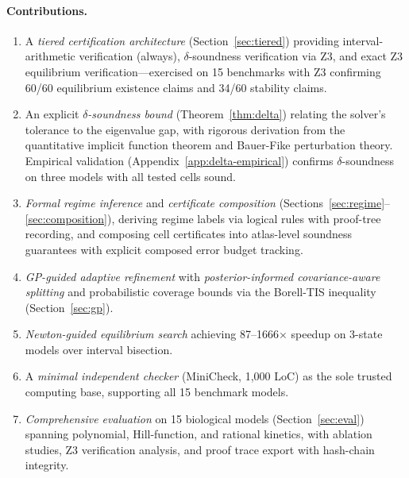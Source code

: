 \documentclass[11pt]{article}
\begin{document}
\paragraph{Contributions.}
\begin{enumerate}[leftmargin=*]
\item A \emph{tiered certification architecture} (Section~\ref{sec:tiered}) providing interval-arithmetic verification (always), $\delta$-soundness verification via Z3, and exact Z3 equilibrium verification---exercised on 15 benchmarks with Z3 confirming 60/60 equilibrium existence claims and 34/60 stability claims.

\item An explicit \emph{$\delta$-soundness bound} (Theorem~\ref{thm:delta}) relating the solver's tolerance to the eigenvalue gap, with rigorous derivation from the quantitative implicit function theorem and Bauer-Fike perturbation theory.  Empirical validation (Appendix~\ref{app:delta-empirical}) confirms $\delta$-soundness on three models with all tested cells sound.

\item \emph{Formal regime inference} and \emph{certificate composition} (Sections~\ref{sec:regime}--\ref{sec:composition}), deriving regime labels via logical rules with proof-tree recording, and composing cell certificates into atlas-level soundness guarantees with explicit composed error budget tracking.

\item \emph{GP-guided adaptive refinement} with \emph{posterior-informed covariance-aware splitting} and probabilistic coverage bounds via the Borell-TIS inequality (Section~\ref{sec:gp}).

\item \emph{Newton-guided equilibrium search} achieving 87--1666$\times$ speedup on 3-state models over interval bisection.

\item A \emph{minimal independent checker} (MiniCheck, 1{,}000 LoC) as the sole trusted computing base, supporting all 15 benchmark models.

\item \emph{Comprehensive evaluation} on 15 biological models (Section~\ref{sec:eval}) spanning polynomial, Hill-function, and rational kinetics, with ablation studies, Z3 verification analysis, and proof trace export with hash-chain integrity.
\end{enumerate}

\end{document}
